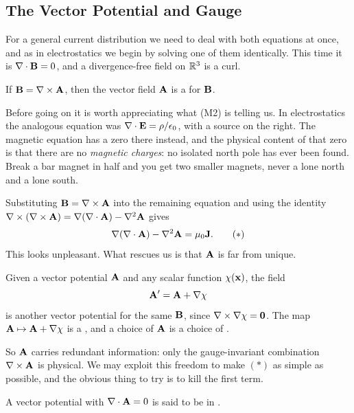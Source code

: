 \documentclass[a4paper]{scrartcl}
\begin{document}
\subsection{The Vector Potential and Gauge}

For a general current distribution we need to deal with both equations at once, and as in electrostatics we begin by solving one of them identically. This time it is $\nabla\cdot\mathbf{B} = 0$, and a divergence-free field on $\mathbb{R}^3$ is a curl.

\begin{definition}
	If $\mathbf{B} = \nabla \times \mathbf{A}$, then the vector field $\mathbf{A}$ is a  for $\mathbf{B}$.
\end{definition}

Before going on it is worth appreciating what (M2) is telling us. In electrostatics the analogous equation was $\nabla\cdot\mathbf{E} = \rho/\epsilon_0$, with a source on the right. The magnetic equation has a zero there instead, and the physical content of that zero is that there are no \emph{magnetic charges}: no isolated north pole has ever been found. Break a bar magnet in half and you get two smaller magnets, never a lone north and a lone south.

Substituting $\mathbf{B} = \nabla\times\mathbf{A}$ into the remaining equation and using the identity $\nabla\times(\nabla\times \mathbf{A}) = \nabla(\nabla\cdot \mathbf{A}) - \nabla^2 \mathbf{A}$ gives
\begin{align*}
\nabla(\nabla\cdot \mathbf{A}) - \nabla^2 \mathbf{A} = \mu_0 \mathbf{J}. \tag{$*$}
\end{align*}
This looks unpleasant. What rescues us is that $\mathbf{A}$ is far from unique.

\begin{definition}
	Given a vector potential $\mathbf{A}$ and any scalar function $\chi(\mathbf{x})$, the field
	$$
	\mathbf{A}' = \mathbf{A} + \nabla \chi
	$$
	is another vector potential for the same $\mathbf{B}$, since $\nabla\times \nabla\chi = \mathbf{0}$. The map $\mathbf{A}\mapsto \mathbf{A}+\nabla\chi$ is a , and a choice of $\mathbf{A}$ is a choice of .
\end{definition}

So $\mathbf{A}$ carries redundant information: only the gauge-invariant combination $\nabla\times \mathbf{A}$ is physical. We may exploit this freedom to make $(*)$ as simple as possible, and the obvious thing to try is to kill the first term.

\begin{definition}
	A vector potential with $\nabla\cdot \mathbf{A} = 0$ is said to be in .
\end{definition}
\end{document}
